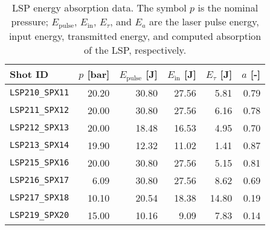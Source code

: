 \begin{table}[h]
\centering
\caption[LSP energy absorption data]{LSP energy absorption data. The symbol $p$ is the nominal pressure; $E_\mathrm{pulse}$, $E_\mathrm{in}$, $E_\tau$, and $E_a$ are the laser pulse energy, input energy, transmitted energy, and computed absorption of the LSP, respectively.}
\label{tab:LSP_absorption}
\begin{tabular}{@{}lrrrrr@{}}
\toprule
Shot ID & $p$ [bar] & $E_\mathrm{pulse}$ [J] & $E_\mathrm{in}$ [J] & $E_\tau$ [J] & $a$ [-] \\
\midrule
\verb|LSP210_SPX11| &     20.20 &                  30.80 &               27.56 &         5.81 &    0.79 \\
\verb|LSP211_SPX12| &     20.00 &                  30.80 &               27.56 &         6.16 &    0.78 \\
\verb|LSP212_SPX13| &     20.00 &                  18.48 &               16.53 &         4.95 &    0.70 \\
\verb|LSP213_SPX14| &     19.90 &                  12.32 &               11.02 &         1.41 &    0.87 \\
\verb|LSP215_SPX16| &     20.00 &                  30.80 &               27.56 &         5.15 &    0.81 \\
\verb|LSP216_SPX17| &      6.09 &                  30.80 &               27.56 &         8.62 &    0.69 \\
\verb|LSP217_SPX18| &     10.10 &                  20.54 &               18.38 &        14.80 &    0.19 \\
\verb|LSP219_SPX20| &     15.00 &                  10.16 &                9.09 &         7.83 &    0.14 \\
\bottomrule
\end{tabular}
\end{table}
